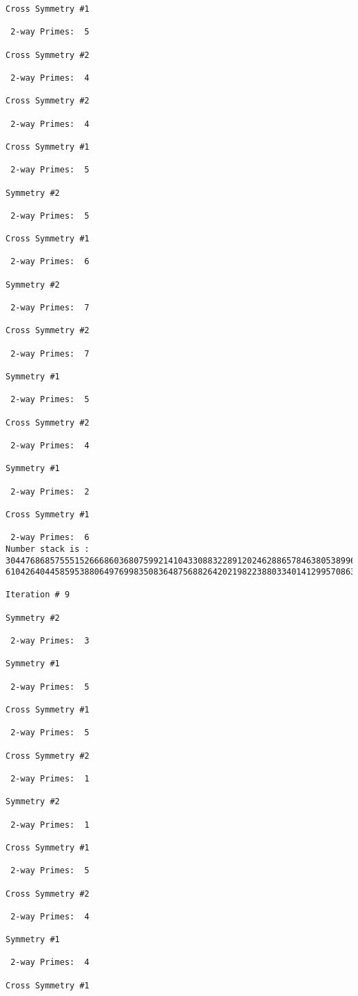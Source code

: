 \begin{verbatim}
Cross Symmetry #1

 2-way Primes: 	5

Cross Symmetry #2

 2-way Primes: 	4

Cross Symmetry #2

 2-way Primes: 	4

Cross Symmetry #1

 2-way Primes: 	5

Symmetry #2

 2-way Primes: 	5

Cross Symmetry #1

 2-way Primes: 	6

Symmetry #2

 2-way Primes: 	7

Cross Symmetry #2

 2-way Primes: 	7

Symmetry #1

 2-way Primes: 	5

Cross Symmetry #2

 2-way Primes: 	4

Symmetry #1

 2-way Primes: 	2

Cross Symmetry #1

 2-way Primes: 	6
Number stack is :
30447686857555152666860368075992141043308832289120246288657846380538996794608835958544046240163340857
61042640445859538806497699835083648756882642021982238803340141299570863068666251555758686744037580433

Iteration #	9

Symmetry #2

 2-way Primes: 	3

Symmetry #1

 2-way Primes: 	5

Cross Symmetry #1

 2-way Primes: 	5

Cross Symmetry #2

 2-way Primes: 	1

Symmetry #2

 2-way Primes: 	1

Cross Symmetry #1

 2-way Primes: 	5

Cross Symmetry #2

 2-way Primes: 	4

Symmetry #1

 2-way Primes: 	4

Cross Symmetry #1


\end{verbatim}
